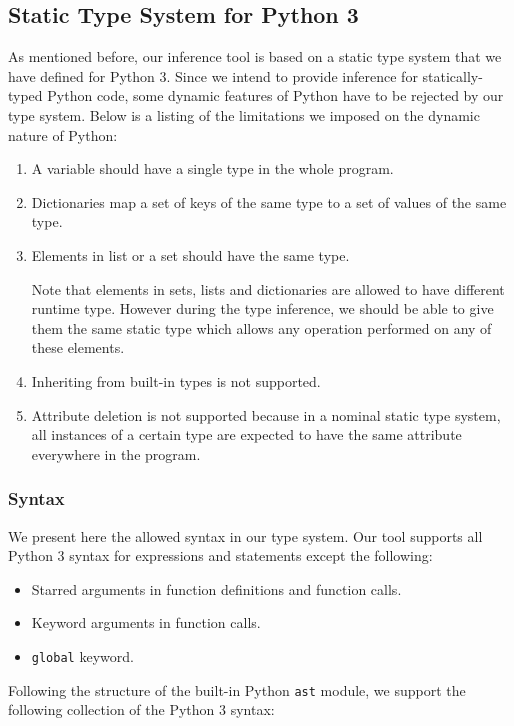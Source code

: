 \subsection{Static Type System for Python 3}\label{sub:st_ts_3}
As mentioned before, our inference tool is based on a static type system that we have defined for Python 3. Since we intend to provide inference for statically-typed Python code, some dynamic features of Python have to be rejected by our type system. Below is a listing of the limitations we imposed on the dynamic nature of Python:
\begin{enumerate}
	\item A variable should have a single type in the whole program.
	\item Dictionaries map a set of keys of the same type to a set of values of the same type.
	\item Elements in list or a set should have the same type.
	
	Note that elements in sets, lists and dictionaries are allowed to have different runtime type. However during the type inference, we should be able to give them the same static type which allows any operation performed on any of these elements.
	\item Inheriting from built-in types is not supported.
	\item Attribute deletion is not supported because in a nominal static type system, all instances of a certain type are expected to have the same attribute everywhere in the program.
\end{enumerate}

\subsubsection{Syntax}
We present here the allowed syntax in our type system. Our tool supports all Python 3 syntax for expressions and statements except the following:
\begin{itemize}
	\item Starred arguments in function definitions and function calls.
	\item Keyword arguments in function calls.
	\item \lstinline|global| keyword.
\end{itemize}

Following the structure of the built-in Python \lstinline|ast| module, we support the following collection of the Python 3 syntax:

